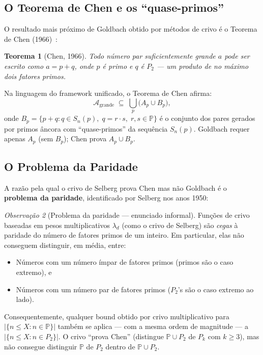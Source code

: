 \documentclass[12pt,a4paper]{article}
\newtheorem{theorem}{Teorema}[section]
\theoremstyle{remark}
\newtheorem{remark}[theorem]{Observa\c{c}\~ao}
\newcommand{\calA}{\mathcal{A}}
\newcommand{\bP}{\mathbb{P}}
\begin{document}
	\subsection{O Teorema de Chen e os ``quase-primos''}
	
	O resultado mais pr\'oximo de Goldbach obtido por m\'etodos de crivo \'e o
	Teorema de Chen (1966)~\cite{chen1966}:
	
	\begin{theorem}[Chen, 1966]
		Todo n\'umero par suficientemente grande $a$ pode ser escrito como $a = p + q$,
		onde $p$ \'e primo e $q$ \'e $P_2$ --- um produto de no m\'aximo dois fatores primos.
	\end{theorem}
	
	Na linguagem do framework unificado, o Teorema de Chen afirma:
	\[
	\calA_{\text{grande}} \;\subseteq\; \bigcup_p \bigl(A_p \cup B_p\bigr),
	\]
	onde $B_p = \{p + q : q \in S_n(p),\; q = r\cdot s,\; r,s \in \bP\}$ \'e o conjunto
	dos pares gerados por primos \^ancora com ``quase-primos'' da sequ\^encia $S_n(p)$.
	Goldbach requer apenas $A_p$ (sem $B_p$); Chen prova $A_p \cup B_p$.
	
	\subsection{O Problema da Paridade}
	
	A raz\~ao pela qual o crivo de Selberg prova Chen mas n\~ao Goldbach \'e o
	\textbf{problema da paridade}, identificado por Selberg nos anos 1950:
	
	\begin{remark}[Problema da paridade --- enunciado informal]
		Fun\c{c}\~oes de crivo baseadas em pesos multiplicativos $\lambda_d$
		(como o crivo de Selberg) s\~ao \emph{cegas} \`a paridade do n\'umero de fatores
		primos de um inteiro.  Em particular, elas n\~ao conseguem distinguir, em m\'edia,
		entre:
		\begin{itemize}
			\item N\'umeros com um n\'umero \'impar de fatores primos (primos s\~ao o caso
			extremo), e
			\item N\'umeros com um n\'umero par de fatores primos ($P_2$'s s\~ao o caso
			extremo ao lado).
		\end{itemize}
		Consequentemente, qualquer bound obtido por crivo multiplicativo
		para $|\{n \leq X : n \in \bP\}|$ tamb\'em se aplica ---
		com a mesma ordem de magnitude ---
		a $|\{n \leq X : n \in P_2\}|$.
		O crivo ``prova Chen'' (distingue $\bP\cup P_2$ de $P_k$ com $k\geq 3$),
		mas n\~ao consegue distinguir $\bP$ de $P_2$ dentro de $\bP\cup P_2$.
	\end{remark}
	
\end{document}
